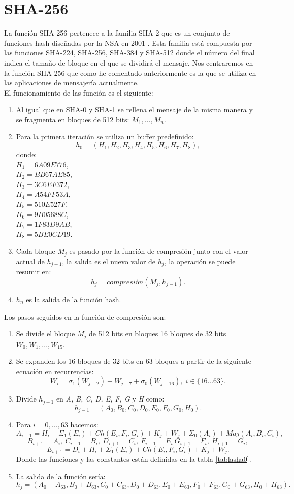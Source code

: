 \section{SHA-256}
La función SHA-256 pertenece a la familia SHA-2 que es un conjunto de funciones hash diseñadas por la NSA en 2001 \cite{Penard2008}. Esta familia está compuesta por las funciones SHA-224, SHA-256, SHA-384 y SHA-512 donde el número del final indica el tamaño de bloque en el que se dividirá el mensaje. Nos centraremos en la función SHA-256 que como he comentado anteriormente es la que se utiliza en las aplicaciones de mensajería actualmente.\\
El funcionamiento de las función es el siguiente\cite{Function2016}:\\
\begin{enumerate}
	\item Al igual que en SHA-0 y SHA-1 se rellena el mensaje de la misma manera y se fragmenta en bloques de 512 bits: $M_1,...,M_n$.
	\item Para la primera iteración se utiliza un buffer predefinido:
	$$
		h_0=(H_1, H_2, H_3, H_4, H_5, H_6, H_7, H_8),
	$$
	donde:\\
	$H_1=6A09E776$,\\
	$H_2=BB67AE85$,\\
	$H_3=3C6EF372$,\\
	$H_4=A54FF53A$,\\
	$H_5=510E527F$,\\
	$H_6=9B05688C$,\\
	$H_7=1F83D9AB$,\\
	$H_8=5BE0CD19$.\\
	\item Cada bloque $M_j$ es pasado por la función de compresión junto con el valor actual de $h_{j-1}$, la salida es el nuevo valor de $h_j$, la operación se puede resumir en:
	$$
		h_j=compresión(M_j,h_{j-1}).
	$$
	\item $h_n$ es la salida de la función hash.
\end{enumerate}
Los pasos seguidos en la función de compresión son:
\begin{enumerate}
	\item Se divide el bloque $M_j$ de 512 bits en bloques 16 bloques de 32 bits $W_0,W_1,...,W_{15}$. 
	\item Se expanden los 16 bloques de 32 bits en 63 bloques a partir de la siguiente ecuación en recurrencias:
	$$
		W_i=\sigma_1(W_{j-2})+W_{j-7}+\sigma_0(W_{j-16}),\; i \in \{16...63\}.
	$$
	\item Divide $h_{j-1}$ en \emph{A, B, C, D, E, F, G} y \emph{H} como:
	$$
		h_{j-1} = (A_0, B_0, C_0, D_0, E_0, F_0, G_0, H_0).
	$$
	\item Para $i=0,...,63$ hacemos:
	$$
		A_{i+1}=H_i+\Sigma_1(E_i)+Ch(E_i,F_i,G_i)+K_j+W_j+\Sigma_0(A_i)+Maj(A_i,B_i,C_i),
	$$
	$$
		B_{i+1}=A_i,\: C_{i+1}=B_i,\: D_{i+1}=C_i,\: F_{i+1}=E_i\: G_{i+1}=F_i,\: H_{i+1}=G_i,
	$$
	$$
		E_{i+1}=D_i+H_i+\Sigma_1(E_i)+Ch(E_i,F_i,G_i)+K_j+W_j.
	$$
	Donde las funciones y las constantes están definidas en la tabla \ref{tablasha0}.
	\item La salida de la función sería:
	$$
		h_j=(A_0+A_{63}, B_0+B_{63}, C_0+C_{63}, D_0+D_{63}, E_0+E_{63}, F_0+F_{63}, G_0+G_{63}, H_0+H_{63}).
	$$
\end{enumerate}
